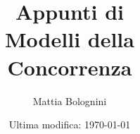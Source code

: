 \documentclass[notoc, oneside, openany]{tufte-book}
\title{
    {\huge Appunti di}\\ 
    Modelli della \\ Concorrenza
}
\author{Mattia Bolognini}
\date{Ultima modifica: \today}
\theoremstyle{definition}
\theoremstyle{remark}
\begin{document}
\justifying
\maketitle

\tableofcontents





\end{document}
